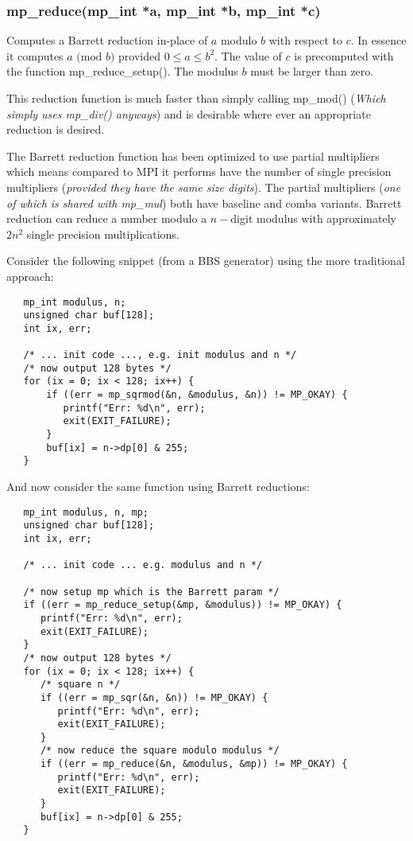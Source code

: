 \documentclass[]{article}
\begin{document}
\subsubsection{mp\_reduce(mp\_int *a, mp\_int *b, mp\_int *c)}
Computes a Barrett reduction in-place of $a$ modulo $b$ with respect to $c$.  In essence it computes 
$a \mbox{ (mod }b\mbox{)}$ provided $0 \le a \le b^2$.  The value of $c$ is precomputed with the 
function mp\_reduce\_setup().  The modulus $b$ must be larger than zero.

This reduction function is much faster than simply calling mp\_mod() (\textit{Which simply uses mp\_div() anyways}) and is
desirable where ever an appropriate reduction is desired.  

The Barrett reduction function has been optimized to use partial multipliers which means compared to MPI it performs
have the number of single precision multipliers (\textit{provided they have the same size digits}).  The partial
multipliers (\textit{one of which is shared with mp\_mul}) both have baseline and comba variants.  Barrett reduction 
can reduce a number modulo a $n-$digit modulus with approximately $2n^2$ single precision multiplications.  

Consider the following snippet (from a BBS generator) using the more traditional approach:

\begin{small}
\begin{verbatim}
   mp_int modulus, n;
   unsigned char buf[128];
   int ix, err;
   
   /* ... init code ..., e.g. init modulus and n */
   /* now output 128 bytes */
   for (ix = 0; ix < 128; ix++) { 
       if ((err = mp_sqrmod(&n, &modulus, &n)) != MP_OKAY) {
          printf("Err: %d\n", err);
          exit(EXIT_FAILURE);
       }
       buf[ix] = n->dp[0] & 255;
   }
\end{verbatim}
\end{small}

And now consider the same function using Barrett reductions:

\begin{small}
\begin{verbatim}
   mp_int modulus, n, mp;
   unsigned char buf[128];
   int ix, err;
   
   /* ... init code ... e.g. modulus and n */
   
   /* now setup mp which is the Barrett param */
   if ((err = mp_reduce_setup(&mp, &modulus)) != MP_OKAY) {
      printf("Err: %d\n", err);
      exit(EXIT_FAILURE);
   }
   /* now output 128 bytes */
   for (ix = 0; ix < 128; ix++) {
      /* square n */
      if ((err = mp_sqr(&n, &n)) != MP_OKAY) {
         printf("Err: %d\n", err);
         exit(EXIT_FAILURE);
      }
      /* now reduce the square modulo modulus */
      if ((err = mp_reduce(&n, &modulus, &mp)) != MP_OKAY) {
         printf("Err: %d\n", err);
         exit(EXIT_FAILURE);
      }
      buf[ix] = n->dp[0] & 255;
   }
\end{verbatim}	
\end{small}
\end{document}
